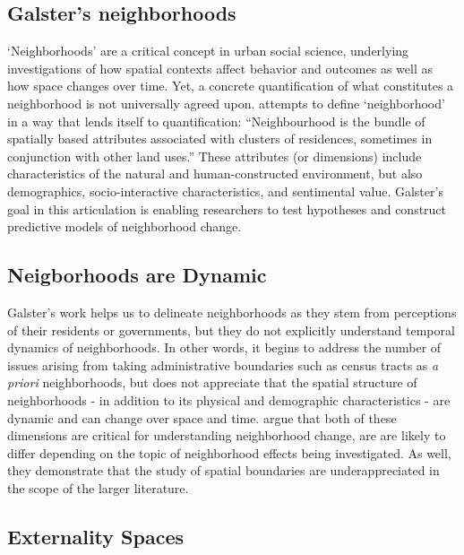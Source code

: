 \subsection{Galster's neighborhoods}

`Neighborhoods' are a critical concept in urban social science,
underlying investigations of how spatial contexts affect behavior and
outcomes as well as how space changes over time. Yet, a concrete
quantification of what constitutes a neighborhood is not universally
agreed upon. \cite{galster2001NatureNeighbourhood} attempts to define
`neighborhood' in a way that lends itself to quantification:
``Neighbourhood is the bundle of spatially based attributes associated
with clusters of residences, sometimes in conjunction with other land
uses.'' These attributes (or dimensions) include characteristics of
the natural and human-constructed environment, but also demographics,
socio-interactive characteristics, and sentimental value. Galster's
goal in this articulation is enabling researchers to test hypotheses
and construct predictive models of neighborhood change.

\subsection{Neigborhoods are Dynamic}

Galster's work helps us to delineate neighborhoods as they stem from
perceptions of their residents or governments, but they do not
explicitly understand temporal dynamics of neighborhoods. In other
words, it begins to address the number of issues arising from taking
administrative boundaries such as census tracts as \emph{a priori}
neighborhoods, but does not appreciate that the spatial structure of
neighborhoods - in addition to its physical and demographic
characteristics - are dynamic and can change over space and
time. \cite{rey2011MeasuringSpatial} argue that both of these
dimensions are critical for understanding neighborhood change, are are
likely to differ depending on the topic of neighborhood effects being
investigated. As well, they demonstrate that the study of spatial
boundaries are underappreciated in the scope of the larger literature.

\subsection{Externality Spaces}

